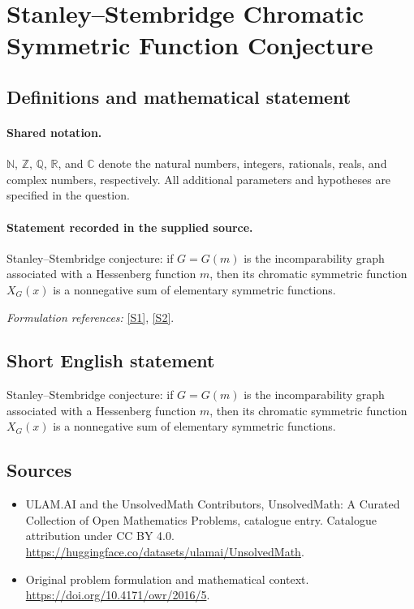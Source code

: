 \documentclass[11pt]{article}
\newcommand{\sref}[2]{\hyperlink{source:#1:#2}{[S#2]}}
\begin{document}
\section{Stanley–Stembridge Chromatic Symmetric Function Conjecture}\label{statement}

\subsection{Definitions and mathematical statement}

\paragraph{Shared notation.}$\mathbb N$, $\mathbb Z$, $\mathbb Q$, $\mathbb R$, and $\mathbb C$ denote the natural numbers, integers, rationals, reals, and complex numbers, respectively. All additional parameters and hypotheses are specified in the question.


\paragraph{Statement recorded in the supplied source.}
Stanley–Stembridge conjecture: if $G=G(m)$ is the incomparability graph associated with a Hessenberg function $m$, then its chromatic symmetric function $X_G(x)$ is a nonnegative sum of elementary symmetric functions.
\par\smallskip\textit{Formulation references:} \sref{statement}{1}, \sref{statement}{2}.
\subsection{Short English statement}
Stanley–Stembridge conjecture: if $G=G(m)$ is the incomparability graph associated with a Hessenberg function $m$, then its chromatic symmetric function $X_G(x)$ is a nonnegative sum of elementary symmetric functions.
\subsection{Sources}
\begin{itemize}
\item[\hypertarget{source:statement:1}{S1}] ULAM.AI and the UnsolvedMath Contributors, UnsolvedMath: A Curated Collection of Open Mathematics Problems, catalogue entry. Catalogue attribution under CC BY 4.0.
\url{https://huggingface.co/datasets/ulamai/UnsolvedMath}.
\item[\hypertarget{source:statement:2}{S2}] Original problem formulation and mathematical context.
\url{https://doi.org/10.4171/owr/2016/5}.
\end{itemize}
\label{end:statement}
\end{document}

